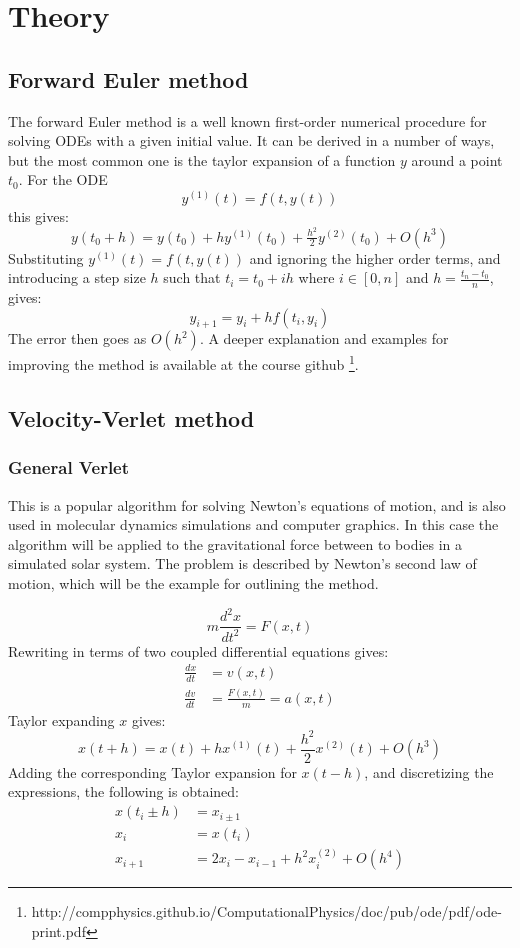 \section{Theory}
\subsection{Forward Euler method}
The forward Euler method is a well known first-order numerical procedure for solving ODEs with a 
given initial value. It can be derived in a number of ways, but the most common one is the 
taylor expansion of a function $y$ around a point $t_0$. For the ODE 
$$y^{(1)}(t) = f(t,y(t))$$ this gives:
\begin{equation*}
y(t_0 + h) =  y(t_0) + hy^{(1)}(t_0) + \tfrac{h^2}{2}y^{(2)}(t_0) + O(h^3)
\end{equation*}
Substituting $y^{(1)}(t) = f(t,y(t))$ and ignoring the higher order terms, and introducing a step size
$h$ such that $t_i = t_0 + ih$ where $i \in [0,n]$ and $h = \frac{t_n-t_0}{n}$, gives:
\begin{equation*} 
y_{i+1} = y_i + hf(t_i, y_i)
\end{equation*}
The error then goes as $O(h^2)$.
\newline
A deeper explanation and examples for improving the method is available at the course github
\footnote{http://compphysics.github.io/ComputationalPhysics/doc/pub/ode/pdf/ode-print.pdf}.

\subsection{Velocity-Verlet method}
\subsubsection{General Verlet}
This is a popular algorithm for solving Newton's equations of motion, and is also used in  
molecular dynamics simulations and computer graphics. In this case the algorithm will be  
applied to the gravitational force between to bodies in a simulated solar system. 
The problem is described by Newton's second law of motion, which will be the example for outlining
the method.

\begin{equation*}
m\frac{d^2x}{dt^2}= F(x,t)
\end{equation*}
Rewriting in terms of two coupled differential equations gives:
\begin{align*}
\frac{dx}{dt} &= v(x,t) \\
\frac{dv}{dt} &= \frac{F(x,t)}{m} = a(x,t)
\end{align*}
Taylor expanding $x$ gives:
\begin{equation*}
x(t+h) = x(t) + hx^{(1)}(t) + \frac{h^2}{2}x^{{(2)}}(t) + O(h^3)
\end{equation*}
Adding the corresponding Taylor expansion for $x(t-h)$, and discretizing the expressions,
the following is obtained:
\begin{align*}
x(t_i \pm h) &= x_{i\pm 1} \\
x_i &= x(t_i) \\
x_{i+1} &= 2x_i - x_{i-1} + h^2 x_i^{{(2)}} + O(h^4)
\end{align*}
